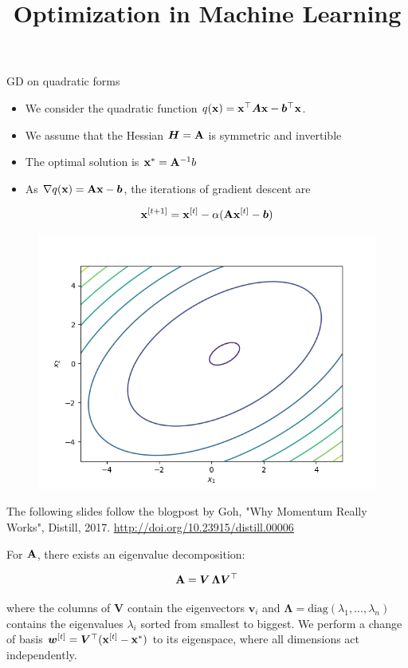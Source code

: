 \documentclass[11pt,compress,t,notes=noshow, xcolor=table]{beamer}
\title{Optimization in Machine Learning}
\date{}
\begin{document}
\sloppy

\begin{vbframe}{GD on quadratic forms}

\begin{itemize}
	\item We consider the quadratic function $q(\mathbf{x}) = \mathbf{x}^\top \bm{A} \mathbf{x} - \bm{b}^\top \mathbf{x}$. 
	\item We assume that the Hessian $\bm{H} = \mathbf{A}$ is symmetric and invertible 
	\item The optimal solution is $\mathbf{x}^\ast = \mathbf{A}^{-1} b$ 
	\item As $\nabla q(\mathbf{x}) = \mathbf{A} \mathbf{x} - \bm{b}$, the iterations of gradient descent are
\end{itemize}
	$$
	\mathbf{x}^{[ t+1 ] } = \mathbf{x}^{[ t ] } - \alpha (\mathbf{A} \mathbf{x}^{[ t ] } - \bm{b})
	$$

\begin{figure}
	\includegraphics[height=0.3\textwidth, keepaspectratio]{figure_man/gd.png} \\
\end{figure}

\begin{footnotesize}
The following slides follow the blogpost by Goh, "Why Momentum Really Works", Distill, 2017. \url{http://doi.org/10.23915/distill.00006}
\end{footnotesize}

\framebreak

For $\mathbf{A}$, there exists an eigenvalue decomposition: 

$$
	\mathbf{A} = \bm{V} \, \bm{\Lambda} \bm{V}^\top
$$

where the columns of $\bm{V}$ contain the eigenvectors $\boldsymbol{v}_i$ and $\bm{\Lambda} = \text{diag}(\lambda_1, ..., \lambda_n)$ contains the eigenvalues $\lambda_i$ sorted from smallest to biggest. We perform a change of basis $\bm{w}^{[ t ] } = \bm{V}^\top (\mathbf{x}^{[ t ] } - \mathbf{x}^\ast)$ to its eigenspace, where all dimensions act independently. 


\end{vbframe}
\end{document}
